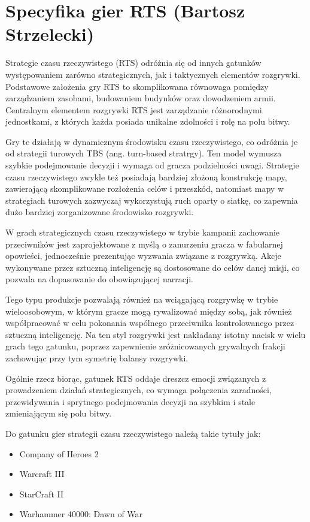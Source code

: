 \section{Specyfika gier RTS (Bartosz Strzelecki)}

Strategie czasu rzeczywistego (RTS) odróżnia się od innych gatunków występowaniem zarówno strategicznych, jak i taktycznych
elementów rozgrywki. Podstawowe założenia gry RTS to skomplikowana równowaga pomiędzy zarządzaniem zasobami, budowaniem budynków oraz
dowodzeniem armii. Centralnym elementem rozgrywki RTS jest zarządzanie różnorodnymi jednostkami, z których każda posiada unikalne zdolności i rolę na polu bitwy.

Gry te działają w dynamicznym środowisku czasu rzeczywistego, co odróżnia je od strategii turowych TBS (ang. turn-based stratrgy). Ten model wymusza szybkie podejmowanie decyzji
i wymaga od gracza podzielności uwagi. Strategie czasu rzeczywistego zwykle też posiadają bardziej złożoną konstrukcję mapy, zawierającą skomplikowane
rozłożenia celów i przeszkód, natomiast mapy w strategiach turowych zazwyczaj wykorzystują ruch oparty o siatkę, co zapewnia dużo bardziej
zorganizowane środowisko rozgrywki.

W grach strategicznych czasu rzeczywistego w trybie kampanii zachowanie przeciwników jest zaprojektowane z myślą o zanurzeniu gracza w fabularnej opowieści, jednocześnie
prezentując wyzwania związane z rozgrywką. Akcje wykonywane przez sztuczną inteligencję są dostosowane do celów danej misji, co pozwala
na dopasowanie do obowiązującej narracji.

Tego typu produkcje pozwalają również na wciągającą rozgrywkę w trybie wieloosobowym, w którym gracze mogą rywalizować między sobą, jak również
współpracować w celu pokonania wspólnego przeciwnika kontrolowanego przez sztuczną inteligencję. Na ten styl rozgrywki jest nakładany istotny nacisk
w wielu grach tego gatunku, poprzez zapewnienie zróżnicowanych grywalnych frakcji zachowując przy tym symetrię balansy rozgrywki.

Ogólnie rzecz biorąc, gatunek RTS oddaje dreszcz emocji związanych z prowadzeniem działań strategicznych, co wymaga połączenia zaradności,
przewidywania i sprytnego podejmowania decyzji na szybkim i stale zmieniającym się polu bitwy.

Do gatunku gier strategii czasu rzeczywistego należą takie tytuły jak:
\begin{itemize}
  \item Company of Heroes 2
  \item Warcraft III
  \item StarCraft II
  \item Warhammer 40000: Dawn of War
\end{itemize}
